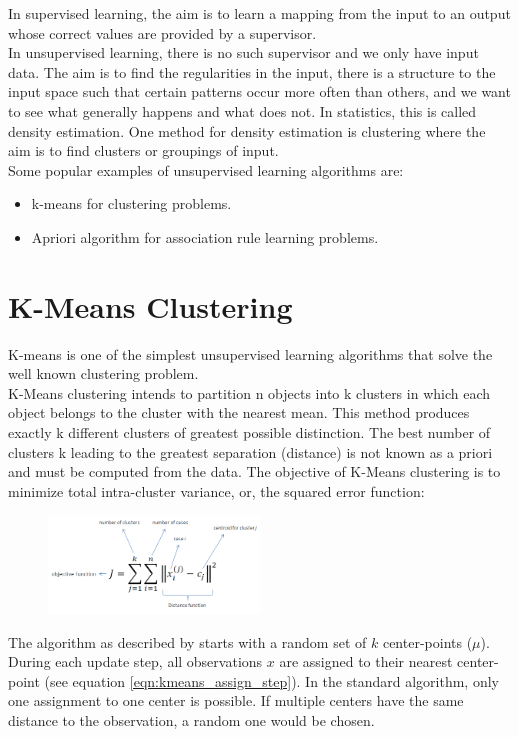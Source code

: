 In supervised learning, the aim is to learn a mapping from the input to
an output whose correct values are provided by a supervisor.\\
In unsupervised
learning, there is no such supervisor and we only have input data.
The aim is to find the regularities in the input, there is a structure to the
input space such that certain patterns occur more often than others, and we want to see what generally happens and what does not. In statistics, this is called density estimation.
One method for density estimation is clustering where the aim is to
find clusters or groupings of input.\\ 
Some popular examples of unsupervised learning algorithms are:


\begin{itemize}
  \item k-means for clustering problems.
  \item Apriori algorithm for association rule learning problems.
\end{itemize}


\section{ K-Means Clustering }
K-means \cite{kmeans} is one of the simplest unsupervised learning algorithms that solve the well known clustering problem. \\ K-Means clustering intends to partition n objects into k clusters in which each object belongs to the cluster with the nearest mean. This method produces exactly k different clusters of greatest possible distinction. The best number of clusters k leading to the greatest separation (distance) is not known as a priori and must be computed from the data. The objective of K-Means clustering is to minimize total intra-cluster variance, or, the squared error function:
\begin{figure}[H]
\centering
\includegraphics[width=0.5\textwidth]{img/ckmeans.png}
\end{figure}

 The algorithm as described by \cite{kmeans} starts with a random set of $k$ center-points ($\mu$). During each update step, all observations $x$ are assigned to their nearest center-point (see equation \ref{eqn:kmeans_assign_step}). In the standard algorithm, only one assignment to one center is possible. If multiple centers have the same distance to the observation, a random one would be chosen.

